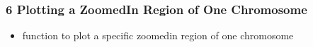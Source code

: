 \documentclass[letterpaper,10pt,english]{sphinxhowto}
\begin{document}
\begin{sphinxVerbatim}[commandchars=\\\{\}]
   
\end{sphinxVerbatim}


\subsubsection{6 \sphinxhyphen{} Plotting a Zoomed\sphinxhyphen{}In Region of One Chromosome}
\label{\detokenize{index:plotting-a-zoomed-in-region-of-one-chromosome}}\begin{itemize}
\item {} 
\sphinxAtStartPar
function to plot a specific zoomed\sphinxhyphen{}in region of one chromosome

\end{itemize}
\end{document}
